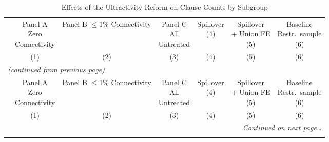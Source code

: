 \documentclass[12pt,letterpaper]{article}
\begin{document}
\scriptsize
\begin{longtable}{l cccccc}
\caption{Effects of the Ultractivity Reform on Clause Counts by Subgroup} \label{tab:subgroup_counts} \\
\toprule\toprule
 & \shortstack{Panel A\\Zero\\Connectivity} & \shortstack{Panel B\\$\leq$1\%\\Connectivity} & \shortstack{Panel C\\All\\Untreated} & \shortstack{Spillover\\(4)} & \shortstack{Spillover\\+ Union FE\\(5)} & \shortstack{Baseline\\Restr.\ sample\\(6)} \\
 & (1) & (2) & (3) & (4) & (5) & (6) \\
\midrule
\endfirsthead
\multicolumn{7}{l}{\small\textit{(continued from previous page)}} \\
\toprule\toprule
 & \shortstack{Panel A\\Zero\\Connectivity} & \shortstack{Panel B\\$\leq$1\%\\Connectivity} & \shortstack{Panel C\\All\\Untreated} & \shortstack{Spillover\\(4)} & \shortstack{Spillover\\+ Union FE\\(5)} & \shortstack{Baseline\\Restr.\ sample\\(6)} \\
 & (1) & (2) & (3) & (4) & (5) & (6) \\
\midrule
\endhead
\midrule
\multicolumn{7}{r}{\small\textit{Continued on next page\ldots}} \\
\endfoot
\bottomrule

\end{longtable}
\end{document}
